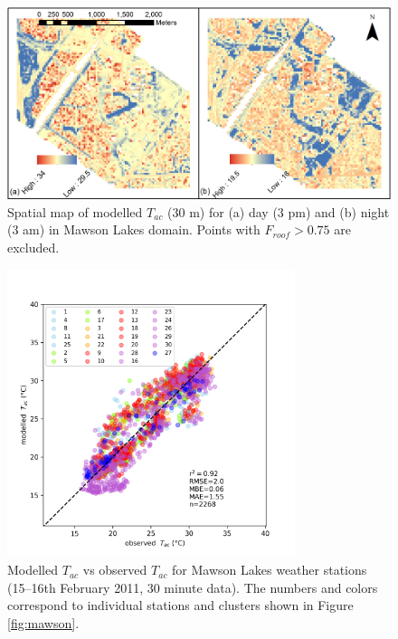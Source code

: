 \documentclass[journal abbreviation, manuscript]{copernicus}
\begin{document}
\begin{figure}[!htbp]

\begin{center}

\end{center}

\includegraphics[width=1\textwidth,keepaspectratio]{figure6.png}

 \caption{Spatial map of modelled $T_{ac}$ (30 m) for (a) day (3 pm) and (b) night (3 am) in Mawson Lakes domain. Points with $F_{roof} > 0.75$ are excluded. } \label{fig:MawsonModelledTas}
\end{figure}





\begin{figure}[!htbp]
\begin{center}


\includegraphics[width=0.75\textwidth,keepaspectratio]{figure7.png}

 \caption{Modelled $T_{ac}$ vs observed $T_{ac}$ for Mawson Lakes weather stations (15--16th February 2011, 30 minute data). The  numbers and colors correspond to individual stations and clusters shown in Figure \ref{fig:mawson}. } \label{fig:MawsonModObs}
\end{center}
\end{figure}
\end{document}

